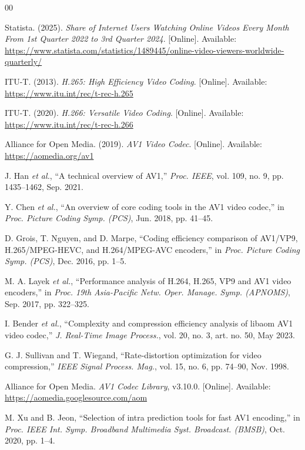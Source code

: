 \documentclass[conference]{IEEEtran}
\begin{document}
\begin{thebibliography}{00}

 Statista. (2025). \emph{Share of Internet Users Watching Online Videos Every Month From 1st Quarter 2022 to 3rd Quarter 2024}. [Online]. Available: \url{https://www.statista.com/statistics/1489445/online-video-viewers-worldwide-quarterly/}

 ITU-T. (2013). \emph{H.265: High Efficiency Video Coding}. [Online]. Available: \url{https://www.itu.int/rec/t-rec-h.265}

 ITU-T. (2020). \emph{H.266: Versatile Video Coding}. [Online]. Available: \url{https://www.itu.int/rec/t-rec-h.266}

 Alliance for Open Media. (2019). \emph{AV1 Video Codec}. [Online]. Available: \url{https://aomedia.org/av1}

 J. Han \emph{et al.}, ``A technical overview of AV1,'' \emph{Proc. IEEE}, vol. 109, no. 9, pp. 1435--1462, Sep. 2021.

 Y. Chen \emph{et al.}, ``An overview of core coding tools in the AV1 video codec,'' in \emph{Proc. Picture Coding Symp. (PCS)}, Jun. 2018, pp. 41--45.

 D. Grois, T. Nguyen, and D. Marpe, ``Coding efficiency comparison of AV1/VP9, H.265/MPEG-HEVC, and H.264/MPEG-AVC encoders,'' in \emph{Proc. Picture Coding Symp. (PCS)}, Dec. 2016, pp. 1--5.

 M. A. Layek \emph{et al.}, ``Performance analysis of H.264, H.265, VP9 and AV1 video encoders,'' in \emph{Proc. 19th Asia-Pacific Netw. Oper. Manage. Symp. (APNOMS)}, Sep. 2017, pp. 322--325.

 I. Bender \emph{et al.}, ``Complexity and compression efficiency analysis of libaom AV1 video codec,'' \emph{J. Real-Time Image Process.}, vol. 20, no. 3, art. no. 50, May 2023.

 G. J. Sullivan and T. Wiegand, ``Rate-distortion optimization for video compression,'' \emph{IEEE Signal Process. Mag.}, vol. 15, no. 6, pp. 74--90, Nov. 1998.

 Alliance for Open Media. \emph{AV1 Codec Library}, v3.10.0. [Online]. Available: \url{https://aomedia.googlesource.com/aom}

 M. Xu and B. Jeon, ``Selection of intra prediction tools for fast AV1 encoding,'' in \emph{Proc. IEEE Int. Symp. Broadband Multimedia Syst. Broadcast. (BMSB)}, Oct. 2020, pp. 1--4.


\end{thebibliography}
\end{document}
